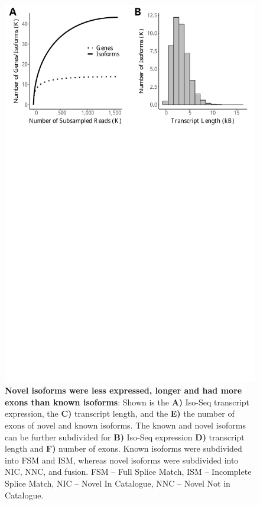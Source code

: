 \begin{figure}[!htp]
	\begin{center}
		\includegraphics[page=4,scale = 0.55]{Figures/IsoSeqWholeTranscriptome.pdf}
	\end{center}
	\captionsetup{width=0.95\textwidth}
	\caption[Comparison of known and novel isoforms detected in the mouse cortex]%
	{\textbf{Novel isoforms were less expressed, longer and had more exons than known isoforms}: Shown is the \textbf{A)} Iso-Seq transcript expression, the \textbf{C)} transcript length, and the \textbf{E)} the number of exons of novel and known isoforms. The known and novel isoforms can be further subdivided for \textbf{B)} Iso-Seq expression \textbf{D)} transcript length and \textbf{F)} number of exons. Known isoforms were subdivided into FSM and ISM, whereas novel isoforms were subdivided into NIC, NNC, and fusion. FSM – Full Splice Match, ISM – Incomplete Splice Match, NIC – Novel In Catalogue, NNC – Novel Not in Catalogue.}   
	\label{fig:isoseq_whole_novel_known_iso_corr}
\end{figure}


